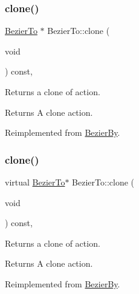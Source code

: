 \subsubsection{\texorpdfstring{clone()}{clone()}\hspace{0.1cm}{\footnotesize\ttfamily [1/2]}}
{\footnotesize\ttfamily \hyperlink{classBezierTo}{Bezier\+To} $\ast$ Bezier\+To\+::clone (\begin{DoxyParamCaption}\item[{void}]{ }\end{DoxyParamCaption}) const\hspace{0.3cm}{\ttfamily [override]}, {\ttfamily [virtual]}}

Returns a clone of action.

\begin{DoxyReturn}{Returns}
A clone action. 
\end{DoxyReturn}


Reimplemented from \hyperlink{classBezierBy_a38e476c4def21766d8592a864813dcfe}{Bezier\+By}.

\mbox{\label{classBezierTo_a3cb15fbd6d2b9038ab3f25608765d54a}} 
\subsubsection{\texorpdfstring{clone()}{clone()}\hspace{0.1cm}{\footnotesize\ttfamily [2/2]}}
{\footnotesize\ttfamily virtual \hyperlink{classBezierTo}{Bezier\+To}$\ast$ Bezier\+To\+::clone (\begin{DoxyParamCaption}\item[{void}]{ }\end{DoxyParamCaption}) const\hspace{0.3cm}{\ttfamily [override]}, {\ttfamily [virtual]}}

Returns a clone of action.

\begin{DoxyReturn}{Returns}
A clone action. 
\end{DoxyReturn}


Reimplemented from \hyperlink{classBezierBy_a38e476c4def21766d8592a864813dcfe}{Bezier\+By}.

\mbox{\label{classBezierTo_ab101906196726dc6cd446999064292ff}} 

